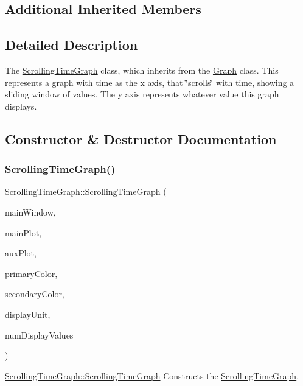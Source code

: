 \subsection*{Additional Inherited Members}


\subsection{Detailed Description}
The \hyperlink{class_scrolling_time_graph}{Scrolling\+Time\+Graph} class, which inherits from the \hyperlink{class_graph}{Graph} class. This represents a graph with time as the x axis, that \char`\"{}scrolls\char`\"{} with time, showing a sliding window of values. The y axis represents whatever value this graph displays. 

\subsection{Constructor \& Destructor Documentation}
\hypertarget{class_scrolling_time_graph_ac7af242514d5770d99d90743a24163ca}{}\label{class_scrolling_time_graph_ac7af242514d5770d99d90743a24163ca} 
\subsubsection{\texorpdfstring{Scrolling\+Time\+Graph()}{ScrollingTimeGraph()}}
{\footnotesize\ttfamily Scrolling\+Time\+Graph\+::\+Scrolling\+Time\+Graph (\begin{DoxyParamCaption}\item[{Q\+Main\+Window $\ast$}]{main\+Window,  }\item[{\hyperlink{class_q_custom_plot}{Q\+Custom\+Plot} $\ast$}]{main\+Plot,  }\item[{\hyperlink{class_q_custom_plot}{Q\+Custom\+Plot} $\ast$}]{aux\+Plot,  }\item[{Q\+Color}]{primary\+Color,  }\item[{Q\+Color}]{secondary\+Color,  }\item[{Q\+String}]{display\+Unit,  }\item[{int}]{num\+Display\+Values }\end{DoxyParamCaption})}



\hyperlink{class_scrolling_time_graph_ac7af242514d5770d99d90743a24163ca}{Scrolling\+Time\+Graph\+::\+Scrolling\+Time\+Graph} Constructs the \hyperlink{class_scrolling_time_graph}{Scrolling\+Time\+Graph}. 


